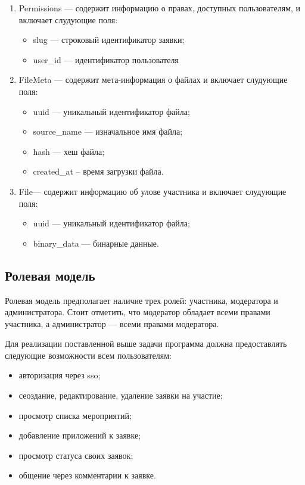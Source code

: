 \begin{enumerate}
	\item Permissions --- содержит информацию о правах, доступных пользователям, и включает слудующие поля:
	\begin{itemize}[label=---]
		\item slug --- строковый идентификатор заявки;
		\item user{\_}id --- идентификатор пользователя
	\end{itemize}
	
	\item FileMeta --- содержит мета-информация о файлах и включает слудующие поля:
	\begin{itemize}[label=---]
		\item uuid --- уникальный идентификатор файла;
		\item source{\_}name --- изначальное имя файла;
		\item hash --- хеш файла;
		\item created{\_}at -- время загрузки файла.
	\end{itemize}
	
	\item File--- содержит информацию об улове участника и включает слудующие поля:
	\begin{itemize}[label=---]
		\item uuid --- уникальный идентификатор файла;
		\item binary{\_}data --- бинарные данные.
	\end{itemize}
	
\end{enumerate}

\subsection{Ролевая модель}

Ролевая модель предполагает наличие трех ролей: участника, модератора и администратора. Стоит отметить, что модератор обладает всеми правами участника, а администратор --- всеми правами модератора.

Для реализации поставленной выше задачи программа должна предоставлять следующие возможности всем пользователям:
\begin{itemize}[label=---]
	\item авторизация через sso;
	\item сеоздание, редактирование, удаление заявки на участие;
	\item просмотр списка мероприятий;
	\item добавление приложений к заявке;
	\item просмотр статуса своих заявок;
	\item общение через комментарии к заявке.
\end{itemize}

